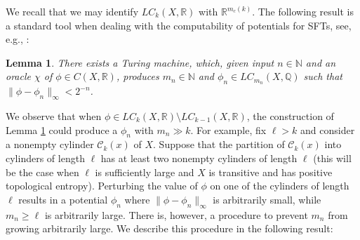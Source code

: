 \documentclass[11pt, reqno]{amsart}
\newtheorem{lemma}[theorem]{Lemma}
\newcommand{\bR}{{\mathbb R}}
\newcommand{\bN}{{\mathbb N}}
\newcommand{\bQ}{{\mathbb Q}}
\newcommand{\cC}{{\mathcal C}}
\begin{document}
We recall that we may identify $LC_k(X,\bR)$ with $\bR^{m_c(k)}$.  The following result is a standard tool when dealing with the computability of potentials for SFTs, see, e.g., \cite{BSW}:
\begin{lemma}\label{lemabLC}
There exists a Turing machine, which, given input $n\in\bN$ and an oracle $\chi$ of $\phi\in C(X,\bR)$, produces $m_n\in\bN$ and $\phi_n\in LC_{m_n}(X,\bQ)$ such that $\|\phi-\phi_n\|_\infty<2^{-n}$.
\end{lemma}

We observe that when $\phi\in LC_k(X,\bR)\setminus LC_{k-1}(X,\bR)$, the construction of Lemma \ref{lemabLC} could produce a $\phi_n$ with $m_n\gg k$.  For example, fix $\ell>k$ and consider a nonempty cylinder $\cC_k(x)$ of $X$.  Suppose that the partition of $\cC_k(x)$ into cylinders of length $\ell$ has at least two nonempty cylinders of length $\ell$ (this will be the case when $\ell$ is sufficiently large and $X$ is transitive and has positive topological entropy).  Perturbing the value of $\phi$ on one of the cylinders of length $\ell$ results in a potential $\phi_n$ where $\|\phi-\phi_n\|_\infty$ is arbitrarily small, while $m_n\geq\ell$ is arbitrarily large.  There is, however, a procedure to prevent $m_n$ from growing arbitrarily large.  We describe this procedure in the following result:
\end{document}
